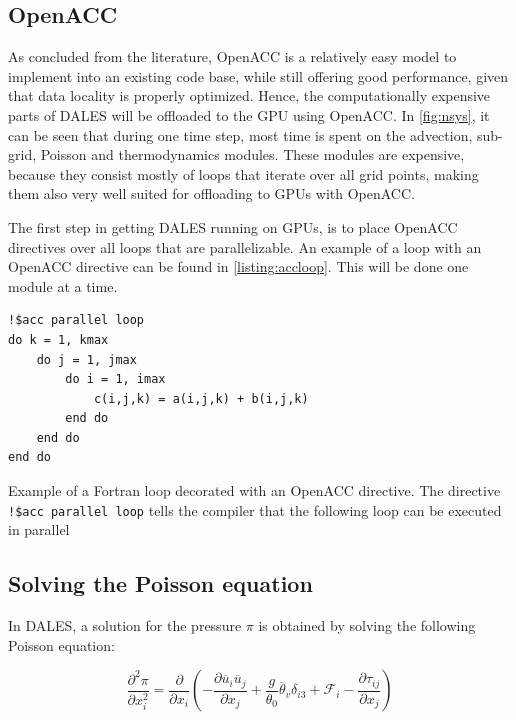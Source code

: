 \subsection{OpenACC}
As concluded from the literature, OpenACC is a relatively easy model to implement into an existing code base, while still offering good performance, given that data locality is properly optimized. Hence, the computationally expensive parts of DALES will be offloaded to the GPU using OpenACC. In \autoref{fig:nsys}, it can be seen that during one time step, most time is spent on the advection, sub-grid, Poisson and thermodynamics modules. These modules are expensive, because they consist mostly of loops that iterate over all grid points, making them also very well suited for offloading to GPUs with OpenACC. 

The first step in getting DALES running on GPUs, is to place OpenACC directives over all loops that are parallelizable. An example of a loop with an OpenACC directive can be found in \autoref{listing:accloop}. This will be done one module at a time. 

\begin{listing}[H]
\begin{verbatim}
!$acc parallel loop
do k = 1, kmax
    do j = 1, jmax
        do i = 1, imax
            c(i,j,k) = a(i,j,k) + b(i,j,k)
        end do
    end do
end do
\end{verbatim}
\caption{Example of a Fortran loop decorated with an OpenACC directive. The directive \texttt{!\$acc parallel loop} tells the compiler that the following loop can be executed in parallel}
\label{listing:accloop}
\end{listing}

\subsection{Solving the Poisson equation}

In DALES, a solution for the pressure $\pi$ is obtained by solving the following Poisson equation:

\begin{equation}
    \frac{\partial^2 \pi}{\partial x_i^2} = \frac{\partial }{\partial x_i} \left( - \frac{\partial \overline{u}_i \overline{u}_j}{\partial x_j} + \frac{g}{\theta_0}\overline{\theta}_v\delta_{i3} + \mathcal{F}_i - \frac{\partial \tau_{ij}}{\partial x_j} \right) \label{eq:pressure}
\end{equation}

